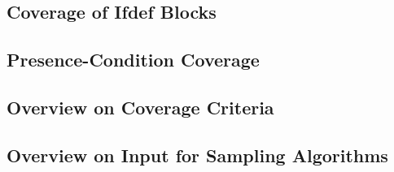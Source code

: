 \subsection{Coverage of Ifdef Blocks}

\subsection{Presence-Condition Coverage}


\subsection{Overview on Coverage Criteria}

\subsection{Overview on Input for Sampling Algorithms}

%

\lessonslearned{
	\item \ldots
}{
	\item \ldots
}{
	\item \ldots
}











